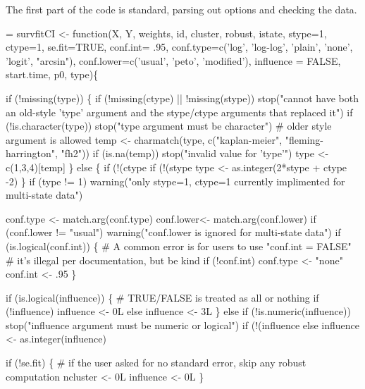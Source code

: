 \documentclass{article}
\begin{document}
The first part of the code is standard, parsing out options and
checking the data.
\begin{nwchunk}
=
 survfitCI <- function(X, Y, weights, id, cluster, robust, istate,
                       stype=1, ctype=1,
                       se.fit=TRUE,
                       conf.int= .95,
                       conf.type=c('log',  'log-log',  'plain', 'none', 
                                   'logit', "arcsin"),
                       conf.lower=c('usual', 'peto', 'modified'),
                       influence = FALSE, start.time, p0, type)\{
 
     if (!missing(type)) \{
         if (!missing(ctype) || !missing(stype))
             stop("cannot have both an old-style 'type' argument and the stype/ctype arguments that replaced it")
         if (!is.character(type)) stop("type argument must be character")
         # older style argument is allowed
         temp <- charmatch(type, c("kaplan-meier", "fleming-harrington", "fh2"))
         if (is.na(temp)) stop("invalid value for 'type'")
         type <- c(1,3,4)[temp]
     \}
     else \{
         if (!(ctype %
         if (!(stype %
         type <- as.integer(2*stype + ctype  -2)
     \}
     if (type != 1) warning("only stype=1, ctype=1 currently implimented for multi-state data")
 
     conf.type <- match.arg(conf.type)
     conf.lower<- match.arg(conf.lower)
     if (conf.lower != "usual") 
         warning("conf.lower is ignored for multi-state data")
     if (is.logical(conf.int)) \{
         # A common error is for users to use "conf.int = FALSE"
         #  it's illegal per documentation, but be kind
         if (!conf.int) conf.type <- "none"
         conf.int <- .95
     \}
 
  
     if (is.logical(influence)) \{
         # TRUE/FALSE is treated as all or nothing
         if (!influence) influence <- 0L
         else influence <- 3L
     \}
     else if (!is.numeric(influence))
         stop("influence argument must be numeric or logical")
     if (!(influence %
     else influence <- as.integer(influence)
  
     if (!se.fit) \{
         # if the user asked for no standard error, skip any robust computation
         ncluster <- 0L
         influence <- 0L
     \}
 

\end{nwchunk}
\end{document}

